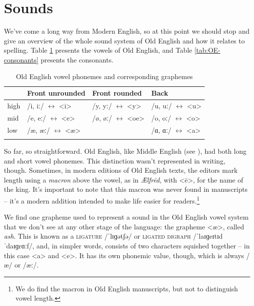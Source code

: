 \section{Sounds}\label{OE-phonology}

We've come a long way from Modern English, so at this point we should stop and give an overview of the whole sound system of Old English and how it relates to spelling. Table \ref{tab:OE-vowels} presents the vowels of Old English, and Table \ref{tab:OE-consonants} presents the consonants.

\begin{table}
    \caption{Old English vowel phonemes and corresponding graphemes}\label{tab:OE-vowels}
  \begin{tabularx}{\textwidth}{XXXl}
\lsptoprule
 ~ & Front unrounded & Front rounded & Back \\
    \midrule
    high & /i, iː/ $\leftrightarrow$ <i> & /y, yː/ $\leftrightarrow$ <y> & /u, uː/ $\leftrightarrow$ <u>\\
    mid & /e, eː/ $\leftrightarrow$ <e> & /ø, øː/ $\leftrightarrow$ <oe> & /o, oː/ $\leftrightarrow$ <o>\\
    low & /æ, æː/ $\leftrightarrow$ <æ> & ~ & /ɑ, ɑː/ $\leftrightarrow$ <a>\\
    \lspbottomrule
  \end{tabularx}
\end{table}

\noindent So far, so straightforward. Old English, like Middle English (see ), had both long and short vowel phonemes. This distinction wasn't represented in writing, though. Sometimes, in modern editions of Old English texts, the editors mark length using a \emph{macron} above the vowel, as in \emph{Ælfrēd}, with <ē>, for the name of the king. It's important to note that this macron was never found in manuscripts -- it's a modern addition intended to make life easier for readers.\footnote{We do find the macron in Old English manuscripts, but not to distinguish vowel length.}

We find one grapheme used to represent a sound in the Old English vowel system that we don't see at any other stage of the language: the grapheme <æ>, called \emph{ash}. This is known as a \textsc{ligature} /ˈlɪɡətʃə/ or \textsc{ligated digraph} /ˈlaɪɡeɪtɪd ˈdaɪɡrɑːf/, and, in simpler words, consists of two characters squished together -- in this case <a> and <e>. It has its own phonemic value, though, which is always /æ/ or /æː/.

